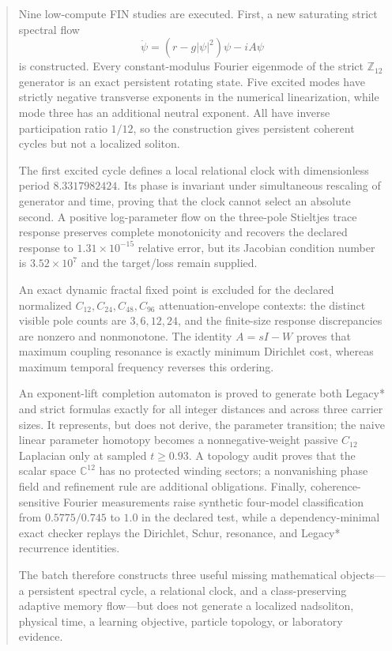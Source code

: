 \documentclass[11pt,a4paper]{article}
\theoremstyle{definition}
\theoremstyle{remark}
\newcommand{\C}{\mathbb C}
\begin{document}
\begin{abstract}
Nine low-compute FIN studies are executed. First, a new saturating strict spectral flow
\[
\dot\psi=(r-g|\psi|^2)\psi-iA\psi
\]
is constructed. Every constant-modulus Fourier eigenmode of the strict $\mathbb Z_{12}$ generator is an exact persistent rotating state. Five excited modes have strictly negative transverse exponents in the numerical linearization, while mode three has an additional neutral exponent. All have inverse participation ratio $1/12$, so the construction gives persistent coherent cycles but not a localized soliton.

The first excited cycle defines a local relational clock with dimensionless period $8.3317982424$. Its phase is invariant under simultaneous rescaling of generator and time, proving that the clock cannot select an absolute second. A positive log-parameter flow on the three-pole Stieltjes trace response preserves complete monotonicity and recovers the declared response to $1.31\times10^{-15}$ relative error, but its Jacobian condition number is $3.52\times10^7$ and the target/loss remain supplied.

An exact dynamic fractal fixed point is excluded for the declared normalized $C_{12},C_{24},C_{48},C_{96}$ attenuation-envelope contexts: the distinct visible pole counts are $3,6,12,24$, and the finite-size response discrepancies are nonzero and nonmonotone. The identity $A=sI-W$ proves that maximum coupling resonance is exactly minimum Dirichlet cost, whereas maximum temporal frequency reverses this ordering.

An exponent-lift completion automaton is proved to generate both Legacy* and strict formulas exactly for all integer distances and across three carrier sizes. It represents, but does not derive, the parameter transition; the naive linear parameter homotopy becomes a nonnegative-weight passive $C_{12}$ Laplacian only at sampled $t\ge0.93$. A topology audit proves that the scalar space $\C^{12}$ has no protected winding sectors; a nonvanishing phase field and refinement rule are additional obligations. Finally, coherence-sensitive Fourier measurements raise synthetic four-model classification from $0.5775/0.745$ to $1.0$ in the declared test, while a dependency-minimal exact checker replays the Dirichlet, Schur, resonance, and Legacy* recurrence identities.

The batch therefore constructs three useful missing mathematical objects---a persistent spectral cycle, a relational clock, and a class-preserving adaptive memory flow---but does not generate a localized nadsoliton, physical time, a learning objective, particle topology, or laboratory evidence.
\end{abstract}
\end{document}
